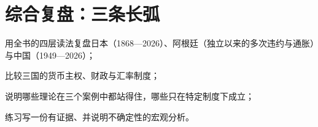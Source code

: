 \chapter{综合复盘：三条长弧}\label{ch:longarcs}

\begin{chapterguide}
\begin{guidegoals}
\item 用全书的四层读法复盘日本（1868—2026）、阿根廷（独立以来的多次违约与通胀）与中国（1949—2026）；
\item 比较三国的货币主权、财政与汇率制度；
\item 说明哪些理论在三个案例中都站得住，哪些只在特定制度下成立；
\item 练习写一份有证据、并说明不确定性的宏观分析。
\end{guidegoals}
\end{chapterguide}

\chapterstub
